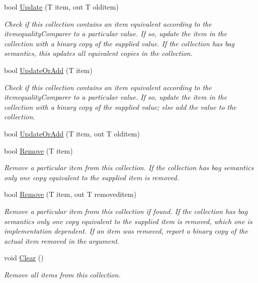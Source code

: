 \begin{DoxyCompactItemize}
bool \hyperlink{class_c5_1_1_tree_bag_aa433d20fdf8caf16236d85b47236c59b}{Update} (T item, out T olditem)
\begin{DoxyCompactList}\small\item\em Check if this collection contains an item equivalent according to the itemequality\+Comparer to a particular value. If so, update the item in the collection with a binary copy of the supplied value. If the collection has bag semantics, this updates all equivalent copies in the collection. \end{DoxyCompactList}\item 
bool \hyperlink{class_c5_1_1_tree_bag_ab80a33bcaea469478a77af16b8387a63}{Update\+Or\+Add} (T item)
\begin{DoxyCompactList}\small\item\em Check if this collection contains an item equivalent according to the itemequality\+Comparer to a particular value. If so, update the item in the collection with a binary copy of the supplied value; else add the value to the collection. \end{DoxyCompactList}\item 
bool \hyperlink{class_c5_1_1_tree_bag_ae83ee2558781cc754bc6b601d23eb334}{Update\+Or\+Add} (T item, out T olditem)
\item 
bool \hyperlink{class_c5_1_1_tree_bag_ac12beb566f28e1e8091a2db06721d43d}{Remove} (T item)
\begin{DoxyCompactList}\small\item\em Remove a particular item from this collection. If the collection has bag semantics only one copy equivalent to the supplied item is removed. \end{DoxyCompactList}\item 
bool \hyperlink{class_c5_1_1_tree_bag_a0e0865e018b7ddae7c0fefb85df150e6}{Remove} (T item, out T removeditem)
\begin{DoxyCompactList}\small\item\em Remove a particular item from this collection if found. If the collection has bag semantics only one copy equivalent to the supplied item is removed, which one is implementation dependent. If an item was removed, report a binary copy of the actual item removed in the argument. \end{DoxyCompactList}\item 
void \hyperlink{class_c5_1_1_tree_bag_a7e7ae58e999b8f2968b784df96d33695}{Clear} ()
\begin{DoxyCompactList}\small\item\em Remove all items from this collection. \end{DoxyCompactList}\item 

\end{DoxyCompactItemize}
